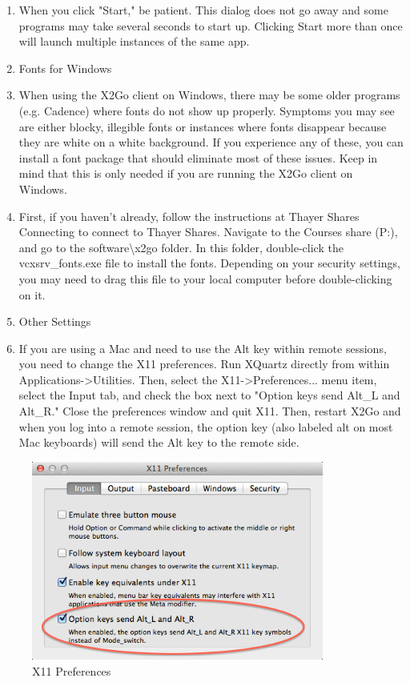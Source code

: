 \begin{enumerate}
	\def\labelenumi{\arabic{enumi}.}
	\setcounter{enumi}{18}
	\item
	When you click "Start," be patient. This dialog does not go away and
	some programs may take several seconds to start up. Clicking Start
	more than once will launch multiple instances of the same app.
	\item
	Fonts for Windows
	\item
	When using the X2Go client on Windows, there may be some older
	programs (e.g. Cadence) where fonts do not show up properly. Symptoms
	you may see are either blocky, illegible fonts or instances where
	fonts disappear because they are white on a white background. If you
	experience any of these, you can install a font package that should
	eliminate most of these issues. Keep in mind that this is only needed
	if you are running the X2Go client on Windows.
	\item
	First, if you haven't already, follow the instructions at Thayer
	Shares Connecting to connect to Thayer Shares. Navigate to the Courses
	share (P:), and go to the software\textbackslash x2go folder. In this
	folder, double-click the vcxsrv\_fonts.exe file to install the fonts.
	Depending on your security settings, you may need to drag this file to
	your local computer before double-clicking on it.
	\item
	Other Settings
	\item
	If you are using a Mac and need to use the Alt key within remote
	sessions, you need to change the X11 preferences. Run XQuartz directly
	from within Applications-\textgreater Utilities. Then, select the
	X11-\textgreater Preferences... menu item, select the Input tab, and
	check the box next to "Option keys send Alt\_L and Alt\_R." Close the
	preferences window and quit X11. Then, restart X2Go and when you log
	into a remote session, the option key (also labeled alt on most Mac
	keyboards) will send the Alt key to the remote side.
\end{enumerate}
\begin{figure}
	\centering
	\includegraphics[width=3.78346in,height=2.57874in]{src/images/image13.png}
	\caption{X11 Preferences}
	\label{fig:fig13}
\end{figure}
\textbf{\hfill\break
}


